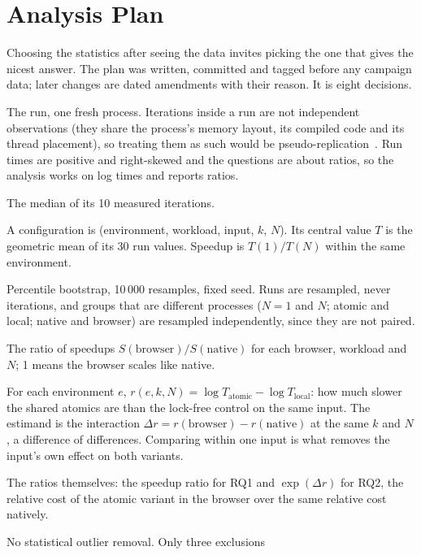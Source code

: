 \section{Analysis Plan}
\label{sec:plan}

Choosing the statistics after seeing the data invites picking the one that
gives the nicest answer. The plan was written, committed and tagged before
any campaign data; later changes are dated amendments with their reason. It
is eight decisions.

\begin{description}[leftmargin=2.5em]
\item[Unit.] The run, one fresh process. Iterations inside a run are not
independent observations (they share the process's memory layout, its
compiled code and its thread placement), so treating them as such would be
pseudo-replication~\cite{georges2007,kalibera2013}. Run times are positive
and right-skewed and the questions are about ratios, so the analysis works
on log times and reports ratios.
\item[D1, per run.] The median of its 10 measured iterations.
\item[D2, per configuration.] A configuration is (environment, workload,
input, $k$, $N$). Its central value $T$ is the geometric mean of its 30 run
values. Speedup is $T(1)/T(N)$ within the same environment.
\item[D3, intervals.] Percentile bootstrap, 10\,000 resamples, fixed seed.
Runs are resampled, never iterations, and groups that are different
processes ($N=1$ and $N$; atomic and local; native and browser) are
resampled independently, since they are not paired.
\item[D4, RQ1.] The ratio of speedups $S(\mathrm{browser})/S(\mathrm{native})$
for each browser, workload and $N$; 1 means the browser scales like native.
\item[D5, RQ2.] For each environment $e$, $r(e,k,N) = \log T_{\mathrm{atomic}}
- \log T_{\mathrm{local}}$: how much slower the shared atomics are than the
lock-free control on the same input. The estimand is the interaction
$\Delta r = r(\mathrm{browser}) - r(\mathrm{native})$ at the same $k$ and
$N$, a difference of differences. Comparing within one input is what
removes the input's own effect on both variants.
\item[D6, effect sizes.] The ratios themselves: the speedup ratio for RQ1
and $\exp(\Delta r)$ for RQ2, the relative cost of the atomic variant in
the browser over the same relative cost natively.
\item[D7, exclusions.] No statistical outlier removal. Only three exclusions

\end{description}

